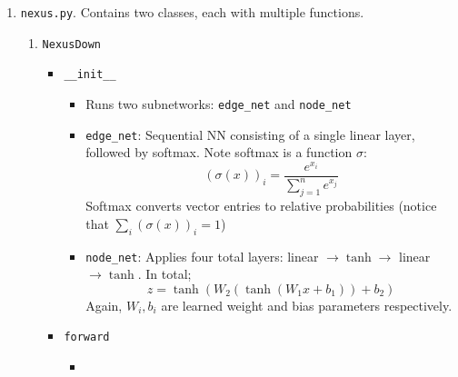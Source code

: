 \begin{itemize}
\begin{enumerate}
\begin{enumerate}
                    \item \texttt{nexus.py}. Contains two classes, each with multiple functions.
                        \begin{enumerate}
                            \item \texttt{NexusDown}
                                \begin{itemize} 
                                    \item \texttt{\_\_init\_\_}
                                        \begin{itemize}
                                            \item Runs two subnetworks: \texttt{edge\_net} and \texttt{node\_net}

                                            \item \texttt{edge\_net}: Sequential NN consisting of a single linear layer, followed by softmax. Note softmax is a function $\sigma$:
                                            \begin{equation}
                                                (\sigma(x))_i = \frac{e^{x_i}}{\sum_{j=1}^n e^{x_j}}
                                            \end{equation}
                                            Softmax converts vector entries to relative probabilities (notice that $\sum_i (\sigma(x))_i = 1$)

                                            \item \texttt{node\_net}: Applies four total layers: linear $\to \tanh \to$ linear $\to \tanh$. In total;
                                            \begin{equation}
                                                z = \tanh\left(W_2\left(\tanh\left(W_1x + b_1\right)\right) + b_2\right)
                                            \end{equation}
                                            Again, $W_i, b_i$ are learned weight and bias parameters respectively.
                                        \end{itemize}

                                    \item \texttt{forward}
                                        \begin{itemize}
                                            \item 
                                        \end{itemize}
                                \end{itemize}


\end{enumerate}
\end{enumerate}
\end{enumerate}
\end{itemize}
